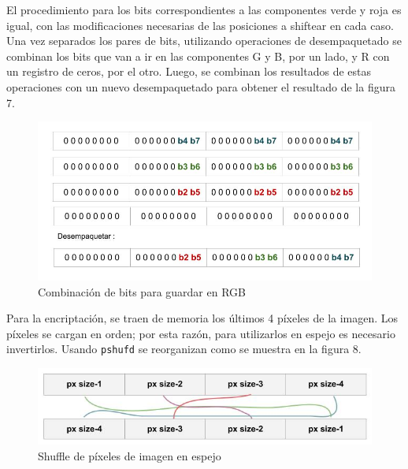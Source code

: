 \documentclass[a4paper]{article}
\begin{document}
El procedimiento para los bits correspondientes a las componentes verde y roja es igual, con las modificaciones necesarias de las posiciones a shiftear en cada caso. \\
Una vez separados los pares de bits, utilizando operaciones de desempaquetado se combinan los bits que van a ir en las componentes G y B, por un lado, y R con un registro de ceros, por el otro. Luego, se combinan los resultados de estas operaciones con un nuevo desempaquetado para obtener el resultado de la figura 7.

\pagebreak

\begin{figure}[h]
  \begin{center}
	\includegraphics[scale=0.4]{img/ocultar/DesempaquetarParesDeBits.jpg}
	\caption{Combinación de bits para guardar en RGB}
  \end{center}
\end{figure}

Para la encriptación, se traen de memoria los últimos 4 píxeles de la imagen. Los píxeles se cargan en orden; por esta razón, para utilizarlos en espejo es necesario invertirlos. Usando {\tt pshufd} se reorganizan como se muestra en la figura 8.

\begin{figure}[!htb]
  \begin{center}
	\includegraphics[scale=0.4]{img/ocultar/PixelShuffle.jpg}
	\caption{Shuffle de píxeles de imagen en espejo}
  \end{center}
\end{figure}
\end{document}
